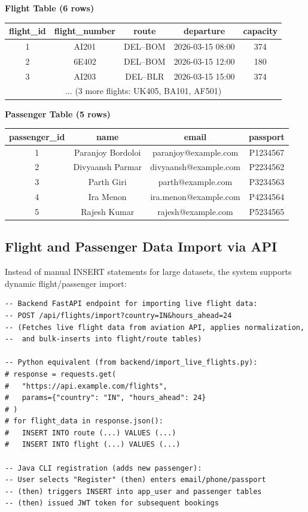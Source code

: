 \documentclass[12pt, a4paper]{article}
\begin{document}
\textbf{Flight Table (6 rows)}
\begin{center}
\small
\begin{tabular}{|c|c|c|c|c|}
\hline
\textbf{flight\_id} & \textbf{flight\_number} & \textbf{route} & \textbf{departure} & \textbf{capacity} \\
\hline
1 & AI201 & DEL--BOM & 2026-03-15 08:00 & 374 \\
\hline
2 & 6E402 & DEL--BOM & 2026-03-15 12:00 & 180 \\
\hline
3 & AI203 & DEL--BLR & 2026-03-15 15:00 & 374 \\
\hline
\multicolumn{5}{|c|}{... (3 more flights: UK405, BA101, AF501)} \\
\hline
\end{tabular}
\end{center}

\textbf{Passenger Table (5 rows)}
\begin{center}
\small
\begin{tabular}{|c|c|c|c|}
\hline
\textbf{passenger\_id} & \textbf{name} & \textbf{email} & \textbf{passport} \\
\hline
1 & Paranjoy Bordoloi & paranjoy@example.com & P1234567 \\
\hline
2 & Divyaansh Parmar & divyaansh@example.com & P2234562 \\
\hline
3 & Parth Giri & parth@example.com & P3234563 \\
\hline
4 & Ira Menon & ira.menon@example.com & P4234564 \\
\hline
5 & Rajesh Kumar & rajesh@example.com & P5234565 \\
\hline
\end{tabular}
\end{center}

\subsection{Flight and Passenger Data Import via API}

Instead of manual INSERT statements for large datasets, the system supports dynamic flight/passenger import:

\begin{lstlisting}[style=sqlstyle]
-- Backend FastAPI endpoint for importing live flight data:
-- POST /api/flights/import?country=IN&hours_ahead=24
-- (Fetches live flight data from aviation API, applies normalization,
--  and bulk-inserts into flight/route tables)

-- Python equivalent (from backend/import_live_flights.py):
# response = requests.get(
#   "https://api.example.com/flights",
#   params={"country": "IN", "hours_ahead": 24}
# )
# for flight_data in response.json():
#   INSERT INTO route (...) VALUES (...)
#   INSERT INTO flight (...) VALUES (...)

-- Java CLI registration (adds new passenger):
-- User selects "Register" (then) enters email/phone/passport
-- (then) triggers INSERT into app_user and passenger tables
-- (then) issued JWT token for subsequent bookings
\end{lstlisting}
\end{document}
